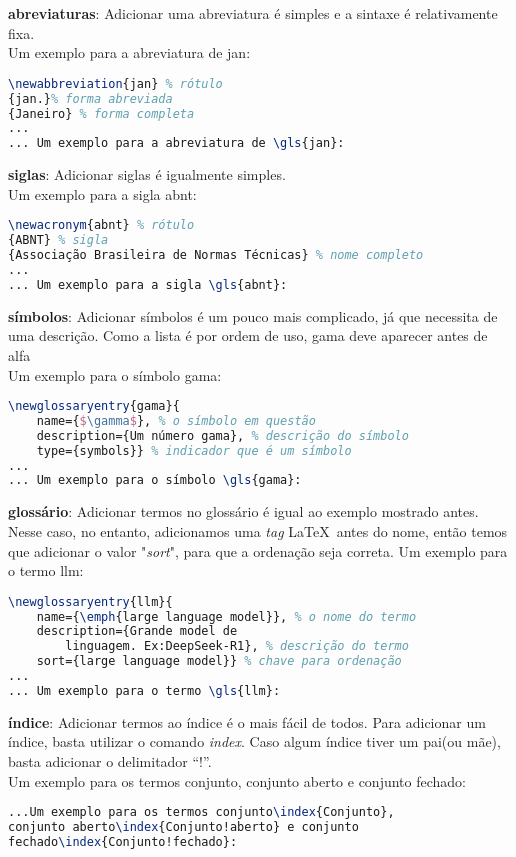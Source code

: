 \begin{alineas}
	\item \textbf{abreviaturas}: Adicionar uma abreviatura é simples e a sintaxe é relativamente fixa.\\ Um exemplo para a abreviatura de \gls{jan}:
		\begin{lstlisting}[language=tex]
\newabbreviation{jan} % rótulo
{jan.}% forma abreviada
{Janeiro} % forma completa
...
... Um exemplo para a abreviatura de \gls{jan}:
		\end{lstlisting}
	
	\item \textbf{siglas}: Adicionar siglas é igualmente simples.\\ 
	Um exemplo para a sigla \gls{abnt}:
	\begin{lstlisting}[language=tex]
\newacronym{abnt} % rótulo
{ABNT} % sigla
{Associação Brasileira de Normas Técnicas} % nome completo
...
... Um exemplo para a sigla \gls{abnt}:
	\end{lstlisting}
	
	\item \textbf{símbolos}: Adicionar símbolos é um pouco mais complicado, já que necessita de uma descrição. Como a lista é por ordem de uso, \gls{gama} deve aparecer antes de \gls{alfa}\\ 
	Um exemplo para o símbolo \gls{gama}:
	\begin{lstlisting}[language=tex]
\newglossaryentry{gama}{
	name={$\gamma$}, % o símbolo em questão
	description={Um número gama}, % descrição do símbolo
	type={symbols}} % indicador que é um símbolo
...
... Um exemplo para o símbolo \gls{gama}:
	\end{lstlisting}
	
	\item \textbf{glossário}: Adicionar termos no glossário é igual ao exemplo mostrado antes.\\
	Nesse caso, no entanto, adicionamos uma \emph{tag} \LaTeX\ antes do nome, então temos que adicionar o valor "\emph{sort}", para que a ordenação seja correta.
	Um exemplo para o termo \gls{llm}:
	\begin{lstlisting}[language=tex]
\newglossaryentry{llm}{
	name={\emph{large language model}}, % o nome do termo
	description={Grande model de 
		linguagem. Ex:DeepSeek-R1}, % descrição do termo
	sort={large language model}} % chave para ordenação
...
... Um exemplo para o termo \gls{llm}:
	\end{lstlisting}
	
	\item \textbf{índice}: Adicionar termos ao índice é o mais fácil de todos. Para adicionar um índice, basta utilizar o comando \emph{index}. Caso algum índice tiver um pai(ou mãe), basta adicionar o delimitador ``!''.\\
	Um exemplo para os termos conjunto, conjunto aberto e conjunto fechado:
	\begin{lstlisting}[language=tex]
...Um exemplo para os termos conjunto\index{Conjunto},
conjunto aberto\index{Conjunto!aberto} e conjunto 
fechado\index{Conjunto!fechado}:
	\end{lstlisting}
	

\end{alineas}
